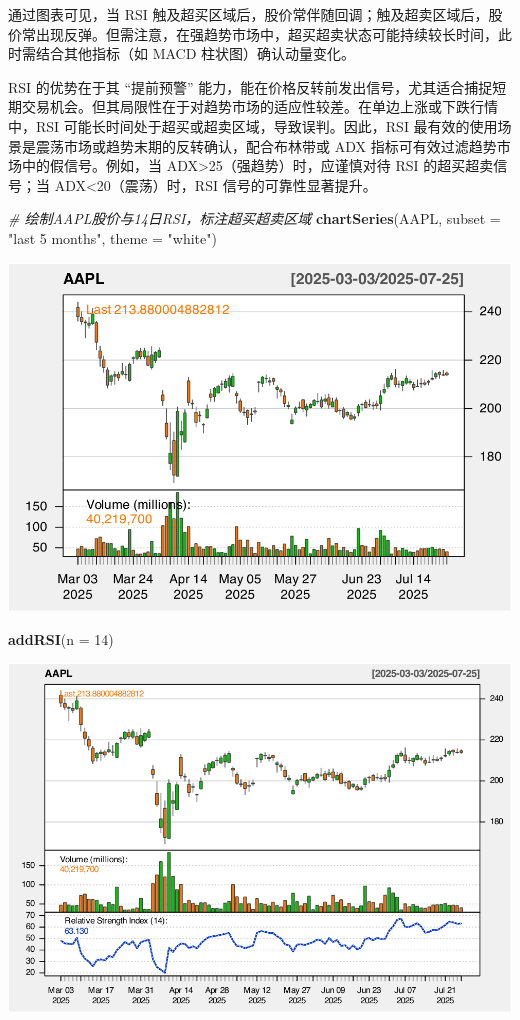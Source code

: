 \documentclass[]{ctexbook}
\newenvironment{Shaded}{\begin{snugshade}}{\end{snugshade}}
\newcommand{\AttributeTok}[1]{\textcolor[rgb]{0.13,0.29,0.53}{#1}}
\newcommand{\CommentTok}[1]{\textcolor[rgb]{0.56,0.35,0.01}{\textit{#1}}}
\newcommand{\DecValTok}[1]{\textcolor[rgb]{0.00,0.00,0.81}{#1}}
\newcommand{\FunctionTok}[1]{\textcolor[rgb]{0.13,0.29,0.53}{\textbf{#1}}}
\newcommand{\NormalTok}[1]{#1}
\newcommand{\StringTok}[1]{\textcolor[rgb]{0.31,0.60,0.02}{#1}}
\begin{document}
通过图表可见，当 RSI 触及超买区域后，股价常伴随回调；触及超卖区域后，股价常出现反弹。但需注意，在强趋势市场中，超买超卖状态可能持续较长时间，此时需结合其他指标（如 MACD 柱状图）确认动量变化。

RSI 的优势在于其 ``提前预警'' 能力，能在价格反转前发出信号，尤其适合捕捉短期交易机会。但其局限性在于对趋势市场的适应性较差。在单边上涨或下跌行情中，RSI 可能长时间处于超买或超卖区域，导致误判。因此，RSI 最有效的使用场景是震荡市场或趋势末期的反转确认，配合布林带或 ADX 指标可有效过滤趋势市场中的假信号。例如，当 ADX\textgreater25（强趋势）时，应谨慎对待 RSI 的超买超卖信号；当 ADX\textless20（震荡）时，RSI 信号的可靠性显著提升。

\begin{Shaded}
\begin{Highlighting}[]
\CommentTok{\# 绘制AAPL股价与14日RSI，标注超买超卖区域}
\FunctionTok{chartSeries}\NormalTok{(AAPL, }\AttributeTok{subset =} \StringTok{"last 5 months"}\NormalTok{, }\AttributeTok{theme =} \StringTok{"white"}\NormalTok{)}
\end{Highlighting}
\end{Shaded}

\includegraphics[width=0.9\linewidth]{QuantmodHandbook_files/figure-latex/rsi_2-1}

\begin{Shaded}
\begin{Highlighting}[]
\FunctionTok{addRSI}\NormalTok{(}\AttributeTok{n =} \DecValTok{14}\NormalTok{)}
\end{Highlighting}
\end{Shaded}

\includegraphics[width=0.9\linewidth]{QuantmodHandbook_files/figure-latex/rsi_2-2}
\end{document}
